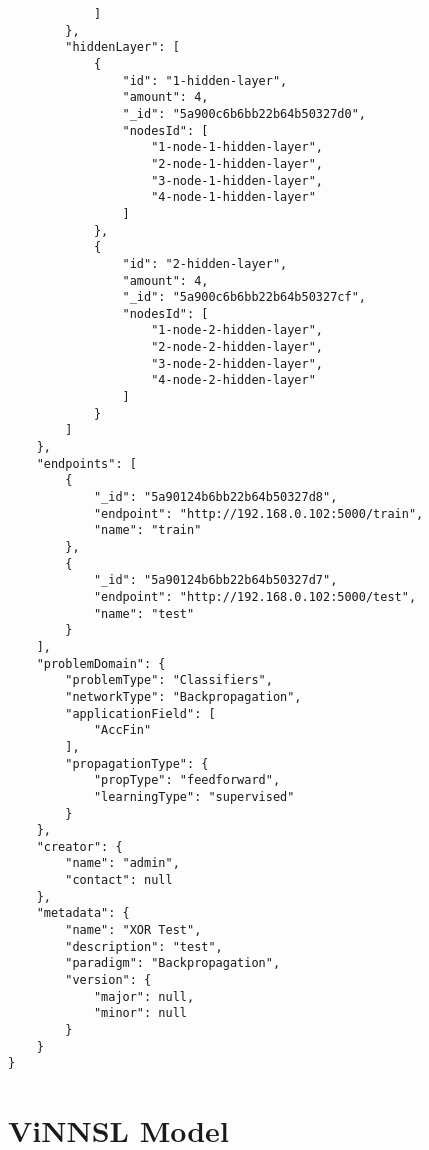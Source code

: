 \begin{lstlisting}
			]
		},
		"hiddenLayer": [
			{
				"id": "1-hidden-layer",
				"amount": 4,
				"_id": "5a900c6b6bb22b64b50327d0",
				"nodesId": [
					"1-node-1-hidden-layer",
					"2-node-1-hidden-layer",
					"3-node-1-hidden-layer",
					"4-node-1-hidden-layer"
				]
			},
			{
				"id": "2-hidden-layer",
				"amount": 4,
				"_id": "5a900c6b6bb22b64b50327cf",
				"nodesId": [
					"1-node-2-hidden-layer",
					"2-node-2-hidden-layer",
					"3-node-2-hidden-layer",
					"4-node-2-hidden-layer"
				]
			}
		]
	},
	"endpoints": [
		{
			"_id": "5a90124b6bb22b64b50327d8",
			"endpoint": "http://192.168.0.102:5000/train",
			"name": "train"
		},
		{
			"_id": "5a90124b6bb22b64b50327d7",
			"endpoint": "http://192.168.0.102:5000/test",
			"name": "test"
		}
	],
	"problemDomain": {
		"problemType": "Classifiers",
		"networkType": "Backpropagation",
		"applicationField": [
			"AccFin"
		],
		"propagationType": {
			"propType": "feedforward",
			"learningType": "supervised"
		}
	},
	"creator": {
		"name": "admin",
		"contact": null
	},
	"metadata": {
		"name": "XOR Test",
		"description": "test",
		"paradigm": "Backpropagation",
		"version": {
			"major": null,
			"minor": null
		}
	}
}
\end{lstlisting}


\section{ViNNSL Model}\label{C}

